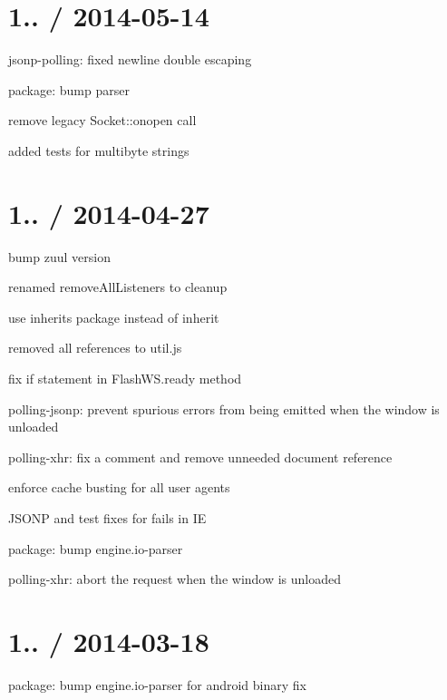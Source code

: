 \section*{1.. / 2014-\/05-\/14 }


\begin{DoxyItemize}
\item jsonp-\/polling\+: fixed newline double escaping
\item package\+: bump parser
\item remove legacy Socket\+::onopen call
\item added tests for multibyte strings
\end{DoxyItemize}

\section*{1.. / 2014-\/04-\/27 }


\begin{DoxyItemize}
\item bump zuul version
\item renamed remove\+All\+Listeners to cleanup
\item use inherits package instead of inherit
\item removed all references to util.\+js
\item fix if statement in Flash\+W\+S.\+ready method
\item polling-\/jsonp\+: prevent spurious errors from being emitted when the window is unloaded
\item polling-\/xhr\+: fix a comment and remove unneeded {\ttfamily document} reference
\item enforce cache busting for all user agents
\item J\+S\+O\+NP and test fixes for fails in IE
\item package\+: bump {\ttfamily engine.\+io-\/parser}
\item polling-\/xhr\+: abort the request when the window is unloaded
\end{DoxyItemize}

\section*{1.. / 2014-\/03-\/18 }


\begin{DoxyItemize}
\item package\+: bump {\ttfamily engine.\+io-\/parser} for android binary fix
\end{DoxyItemize}

